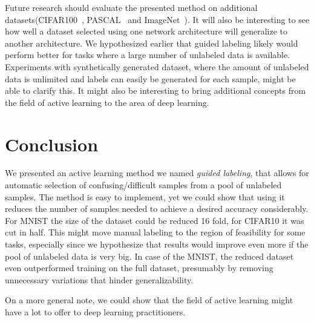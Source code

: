 \documentclass[10pt,twocolumn,letterpaper]{article}
\begin{document}
Future research should evaluate the presented method on additional
datasets(\eg CIFAR100~\cite{krizhevsky2009learning},
PASCAL~\cite{Everingham10} and ImageNet~\cite{ILSVRC15}). It will also
be interesting to see how well a dataset selected using one network
architecture will generalize to another architecture. We hypothesized
earlier that guided labeling likely would perform better for tasks
where a large number of unlabeled data is available. Experiments with
synthetically generated dataset, where the amount of unlabeled data is
unlimited and labels can easily be generated for each sample, might be
able to clarify this. It might also be interesting to bring additional
concepts from the field of active learning \cite{settles2010active} to
the area of deep learning.
\section{Conclusion}
We presented an active learning method we named \textit{guided
  labeling}, that allows for automatic selection of
confusing/difficult samples from a pool of unlabeled samples. The
method is easy to implement, yet we could show that using it reduces
the number of samples needed to achieve a desired accuracy
considerably. For MNIST the size of the dataset could be reduced 16
fold, for CIFAR10 it was cut in half. This might move manual labeling
to the region of feasibility for some tasks, especially since we
hypothesize that results would improve even more if the pool of
unlabeled data is very big. In case of the MNIST, the reduced dataset
even outperformed training on the full dataset, presumably by removing
unnecessary variations that hinder generalizability.

On a more general note, we could show that the field of active
learning might have a lot to offer to deep learning practitioners.

{\small
  
  
}
\end{document}
